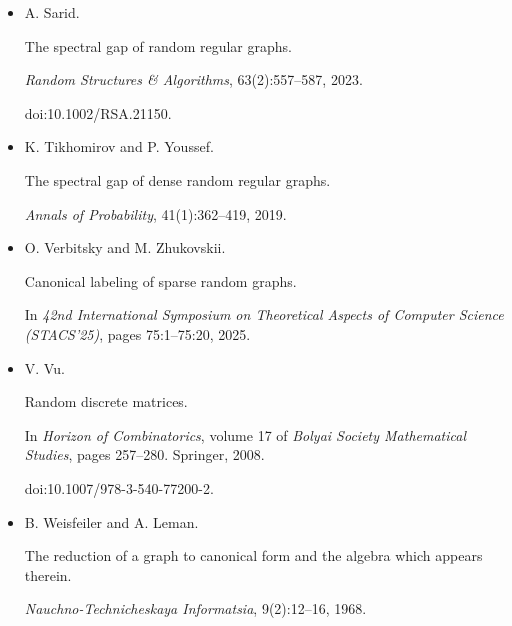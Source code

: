 \begin{itemize}
\item[] 
[45]

A. Sarid.


The spectral gap of random regular graphs.


\emph{Random Structures \& Algorithms}, 63(2):557–587, 2023.


doi:10.1002/RSA.21150.





\item[] 
[46]

K. Tikhomirov and P. Youssef.


The spectral gap of dense random regular graphs.


\emph{Annals of Probability}, 41(1):362–419, 2019.





\item[] 
[47]

O. Verbitsky and M. Zhukovskii.


Canonical labeling of sparse random graphs.


In \emph{42nd International Symposium on Theoretical Aspects of
Computer Science (STACS’25)}, pages 75:1–75:20, 2025.





\item[] 
[48]

V. Vu.


Random discrete matrices.


In \emph{Horizon of Combinatorics}, volume 17 of \emph{Bolyai Society
Mathematical Studies}, pages 257–280. Springer, 2008.


doi:10.1007/978-3-540-77200-2.





\item[] 
[49]

B. Weisfeiler and A. Leman.


The reduction of a graph to canonical form and the algebra which
appears therein.


\emph{Nauchno-Technicheskaya Informatsia}, 9(2):12–16, 1968.





\end{itemize}

